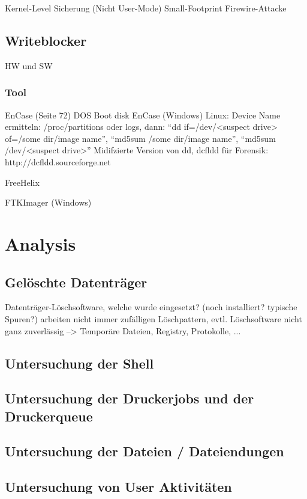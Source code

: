 Kernel-Level Sicherung (Nicht User-Mode)
Small-Footprint
Firewire-Attacke
\subsection{Writeblocker}
HW und SW

\subsubsection{Tool}
EnCase (Seite 72) DOS Boot disk
EnCase (Windows)
Linux: Device Name ermitteln: /proc/partitions oder logs, dann: "`dd if=/dev/<suspect drive> of=/some dir/image name"', "`md5sum /some dir/image name"', "`md5sum /dev/<suspect drive>"'
Midifzierte Version von dd, dcfldd für Forensik: http://dcfldd.sourceforge.net

FreeHelix

FTKImager (Windows)


\section{Analysis}

\subsection{Gelöschte Datenträger}
Datenträger-Löschsoftware, welche wurde eingesetzt? (noch installiert? typische Spuren?) arbeiten nicht immer zufälligen Löschpattern, evtl. Löschsoftware nicht ganz zuverlässig --> Temporäre Dateien, Registry, Protokolle, ...

\subsection{Untersuchung der Shell}

\subsection{Untersuchung der Druckerjobs und der Druckerqueue}

\subsection{Untersuchung der Dateien / Dateiendungen}

\subsection{Untersuchung von User Aktivitäten}


